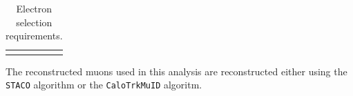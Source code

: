 \begin{table}[]
\begin{tabular}{ l  l l }
{%
    \hline \hline
  \end{tabular}
   \caption{Electron selection requirements.}
   \label{table:objsel-el}
\end{table}

The reconstructed muons used in this analysis are reconstructed either using the
\verb|STACO| algorithm or the \verb|CaloTrkMuID| algoritm. 

